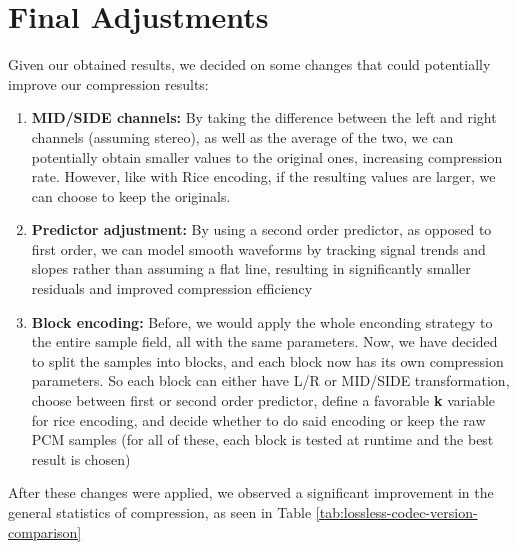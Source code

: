\vspace{10pt}
\section{Final Adjustments}

Given our obtained results, we decided on some changes that could potentially improve our compression results:

\begin{enumerate}

    \item \textbf{MID/SIDE channels:} By taking the difference between the left and right channels (assuming stereo), as well as the average of the two, we can potentially obtain smaller values to the original ones, increasing compression rate. However, like with Rice encoding, if the resulting values are larger, we can choose to keep the originals.
    
    \item \textbf{Predictor adjustment:} By using a second order predictor, as opposed to first order, we can model smooth waveforms by tracking signal trends and slopes rather than assuming a flat line, resulting in significantly smaller residuals and improved compression efficiency
        
    \item \textbf{Block encoding:} Before, we would apply the whole enconding strategy to the entire sample field, all with the same parameters. Now, we have decided to split the samples into blocks, and each block now has its own compression parameters. So each block can either have L/R or MID/SIDE transformation, choose between first or second order predictor, define a favorable \textbf{k} variable for rice encoding, and decide whether to do said encoding or keep the raw PCM samples (for all of these, each block is tested at runtime and the best result is chosen)

\end{enumerate}

After these changes were applied, we observed a significant improvement in the general statistics of compression, as seen in Table \ref{tab:lossless-codec-version-comparison}

